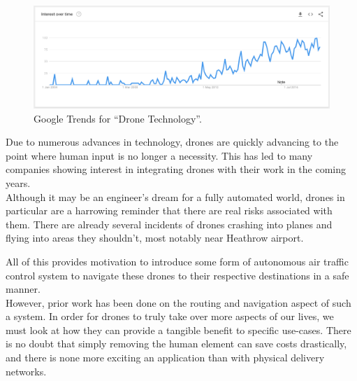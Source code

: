 \documentclass[a4paper,11pt,titlepage]{report}
\begin{document}
\begin{figure}[!hbpt]
  \center
  \includegraphics[width=\linewidth]{img/drone_interest_over_time_google.png}
  \caption{Google Trends for ``Drone Technology''. \cite{Google2018}}
  \label{fig:starship_citizen}
\end{figure}

Due to numerous advances in technology, drones are quickly advancing to the point where human input is no longer a necessity. This has led to many companies showing interest in integrating drones with their work in the coming years. \\

Although it may be an engineer's dream for a fully automated world, drones in particular are a harrowing reminder that there are real risks associated with them. There are already several incidents of drones crashing into planes and flying into areas they shouldn't, most notably near Heathrow airport\cite{BBCNews2017}.

\clearpage
All of this provides motivation to introduce some form of autonomous air traffic control system to navigate these drones to their respective destinations in a safe manner.\\

However, prior work has been done on the routing and navigation aspect of such a system\cite{Balaji2017}. In order for drones to truly take over more aspects of our lives, we must look at how they can provide a tangible benefit to specific use-cases. There is no doubt that simply removing the human element can save costs drastically, and there is none more exciting an application than with physical delivery networks.\\
\end{document}
